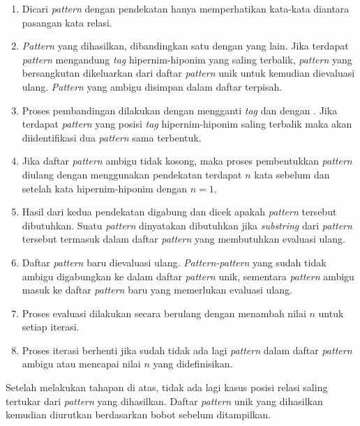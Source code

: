 \begin{enumerate}
  \item Dicari \textit{pattern} dengan pendekatan hanya memperhatikan kata-kata diantara pasangan kata relasi.
  \item \textit{Pattern} yang dihasilkan, dibandingkan satu dengan yang lain. Jika terdapat \textit{pattern} mengandung \textit{tag} hipernim-hiponim yang saling terbalik, \textit{pattern} yang bersangkutan dikeluarkan dari daftar \textit{pattern} unik untuk kemudian dievaluasi ulang. \textit{Pattern} yang ambigu disimpan dalam daftar terpisah.
  \item Proses pembandingan dilakukan dengan mengganti \textit{tag} {\tagHypernym} dan {\tagHypernym} dengan {\tagRelation}. Jika terdapat \textit{pattern} yang posisi \textit{tag} hipernim-hiponim saling terbalik maka akan diidentifikasi dua \textit{pattern} sama terbentuk.
  \item Jika daftar \textit{pattern} ambigu tidak kosong, maka proses pembentukkan \textit{pattern} diulang dengan menggunakan pendekatan  terdapat $n$ kata sebelum dan setelah kata hipernim-hiponim dengan $n=1$.
  \item Hasil dari kedua pendekatan digabung dan dicek apakah \textit{pattern} tersebut dibutuhkan. Suatu \textit{pattern} dinyatakan dibutuhkan jika \textit{substring} dari \textit{pattern} tersebut termasuk dalam daftar \textit{pattern} yang membutuhkan evaluasi ulang.
  \item Daftar \textit{pattern} baru dievaluasi ulang. \textit{Pattern-pattern} yang sudah tidak ambigu digabungkan ke dalam daftar \textit{pattern} unik, sementara \textit{pattern} ambigu masuk ke daftar \textit{pattern} baru yang memerlukan evaluasi ulang.
  \item Proses evaluasi dilakukan secara berulang dengan menambah nilai $n$ untuk setiap iterasi.
  \item Proses iterasi berhenti jika sudah tidak ada lagi \textit{pattern} dalam daftar \textit{pattern} ambigu atau mencapai nilai $n$ yang didefinisikan.
\end{enumerate}

\noindent Setelah melakukan tahapan di atas, tidak ada lagi kasus posisi relasi saling tertukar dari \textit{pattern} yang dihasilkan. Daftar \textit{pattern} unik yang dihasilkan kemudian diurutkan berdasarkan bobot sebelum ditampilkan.
%

